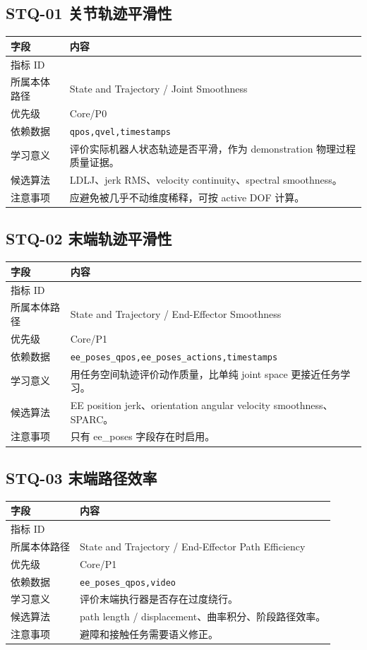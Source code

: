 \documentclass[UTF8,zihao=-4]{ctexart}
\newcommand{\Code}[1]{\texttt{#1}}
\newcommand{\MID}[1]{\texttt{\seqsplit{#1}}}
\begin{document}
\subsection{STQ-01 关节轨迹平滑性}

\begin{longtable}{L{3.6cm} L{9.6cm}}
\toprule
字段 & 内容 \\
\midrule
指标 ID & \MID{STQ-01} \\
所属本体路径 & State and Trajectory / Joint Smoothness \\
优先级 & Core/P0 \\
依赖数据 & \Code{qpos,qvel,timestamps} \\
学习意义 & 评价实际机器人状态轨迹是否平滑，作为 demonstration 物理过程质量证据。 \\
候选算法 & LDLJ、jerk RMS、velocity continuity、spectral smoothness。 \\
注意事项 & 应避免被几乎不动维度稀释，可按 active DOF 计算。 \\
\bottomrule
\end{longtable}

\subsection{STQ-02 末端轨迹平滑性}

\begin{longtable}{L{3.6cm} L{9.6cm}}
\toprule
字段 & 内容 \\
\midrule
指标 ID & \MID{STQ-02} \\
所属本体路径 & State and Trajectory / End-Effector Smoothness \\
优先级 & Core/P1 \\
依赖数据 & \Code{ee\_poses\_qpos,ee\_poses\_actions,timestamps} \\
学习意义 & 用任务空间轨迹评价动作质量，比单纯 joint space 更接近任务学习。 \\
候选算法 & EE position jerk、orientation angular velocity smoothness、SPARC。 \\
注意事项 & 只有 ee\_poses 字段存在时启用。 \\
\bottomrule
\end{longtable}

\subsection{STQ-03 末端路径效率}

\begin{longtable}{L{3.6cm} L{9.6cm}}
\toprule
字段 & 内容 \\
\midrule
指标 ID & \MID{STQ-03} \\
所属本体路径 & State and Trajectory / End-Effector Path Efficiency \\
优先级 & Core/P1 \\
依赖数据 & \Code{ee\_poses\_qpos,video} \\
学习意义 & 评价末端执行器是否存在过度绕行。 \\
候选算法 & path length / displacement、曲率积分、阶段路径效率。 \\
注意事项 & 避障和接触任务需要语义修正。 \\
\bottomrule
\end{longtable}
\end{document}
